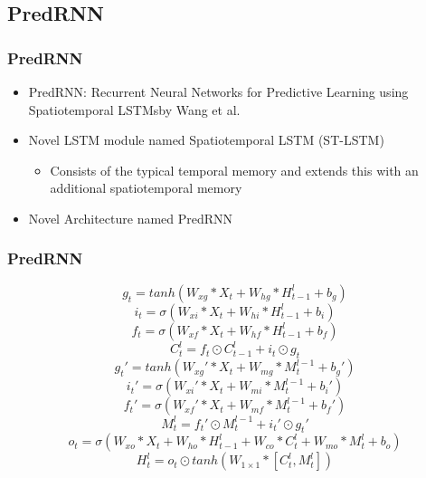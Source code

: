  \subsection{PredRNN}
  \begin{frame}
   \frametitle{PredRNN}
   
   \begin{itemize}
    \item<1-> \glqq PredRNN: Recurrent Neural Networks for Predictive Learning using Spatiotemporal LSTMs\grqq by Wang et al. \cite{Wang2017}
    \item<2-> Novel LSTM module named Spatiotemporal LSTM (ST-LSTM)
    \begin{itemize}
     \item<3-> Consists of the typical temporal memory and extends this with an additional spatiotemporal memory
    \end{itemize}
    \item<4-> Novel Architecture named PredRNN
   \end{itemize}
  
  \end{frame}
  \begin{frame}
   \frametitle{PredRNN}
   
   \begin{equation}
   g_t = tanh(W_{xg} \ast X_t + W_{hg} \ast H_{t-1}^l + b_g)
  \end{equation}
  \begin{equation}
   i_t = \sigma(W_{xi} \ast X_t + W_{hi} \ast H_{t-1}^l +b_i)
  \end{equation}
  \begin{equation}
   f_t = \sigma(W_{xf} \ast X_t + W_{hf} \ast H_{t-1}^l + b_f)
  \end{equation}
  \begin{equation}
   C_t^l = f_t \odot C_{t-1}^l + i_t \odot g_t
  \end{equation}
  \begin{equation}
   g_t\prime = tanh(W_{xg}\prime \ast X_t + W_{mg} \ast M_t^{l-1} + b_g\prime)
  \end{equation}
  \begin{equation}
   i_t\prime = \sigma(W_{xi}\prime \ast X_t + W_{mi} \ast M_t^{l-1} + b_i\prime)
  \end{equation}
  \begin{equation}
   f_t\prime = \sigma(W_{xf}\prime \ast X_t + W_{mf} \ast M_t^{l-1} + b_f\prime)
  \end{equation}
  \begin{equation}
   M_t^l = f_t\prime \odot M_t^{l-1} + i_t\prime \odot g_t\prime
  \end{equation}
  \begin{equation}
   o_t = \sigma(W_{xo} \ast X_t + W_{ho} \ast H_{t-1}^l + W_{co} \ast C_t^l + W_{mo} \ast M_t^l + b_o)
  \end{equation}
  \begin{equation}
   H_t^l = o_t \odot tanh(W_{1 \times 1} \ast [C_t^l, M_t^l])
  \end{equation}
   
  \end{frame}
